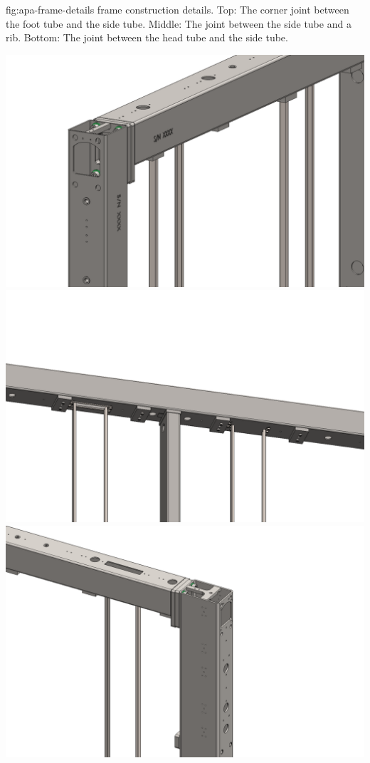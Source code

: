 \begin{dunefigure}{fig:apa-frame-details}
{ frame construction details. Top: The corner joint between the foot tube and the side tube. Middle: The joint between the side tube and a rib. Bottom: The joint between the head tube and the side tube.}

\includegraphics[height=0.31\textheight,trim=0mm 0mm 0mm 0mm,clip]{graphics/sp-apa-frame-foot.pdf}
\includegraphics[height=0.28\textheight,trim=0mm 0mm 0mm 0mm,clip]{graphics/sp-apa-frame-side-joint.pdf}
\includegraphics[height=0.32\textheight]{graphics/sp-apa-frame-head.pdf}
\end{dunefigure}

